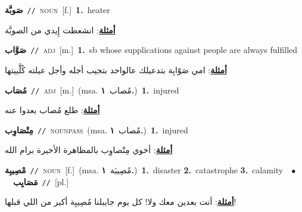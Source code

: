 \documentclass[10pt,a4paper,twoside]{article} %
\begin{document}
\begin{multicols}{2}
{\setlength\topsep{0pt}\textbf{\foreignlanguage{arabic}{صَوبَّة}}\ {\color{gray}\texttt{//}\color{black}}\ \textsc{noun}\ [f.]\ \textbf{1.}~heater\  \begin{flushright}\color{gray}\foreignlanguage{arabic}{\textbf{\underline{\foreignlanguage{arabic}{أمثلة}}}: انشعطت إِيدي من الصوبَّة}\end{flushright}\color{black}} \vspace{2mm}

{\setlength\topsep{0pt}\textbf{\foreignlanguage{arabic}{صَوَّاب}}\ {\color{gray}\texttt{//}\color{black}}\ \textsc{adj}\ [m.]\ \textbf{1.}~sb whose supplications against people are always fulfilled\  \begin{flushright}\color{gray}\foreignlanguage{arabic}{\textbf{\underline{\foreignlanguage{arabic}{أمثلة}}}: امي صَوّابِة بتدعيلك عالواحد بتجيب أجله وأجل عيلته كُلَّييتها}\end{flushright}\color{black}} \vspace{2mm}

{\setlength\topsep{0pt}\textbf{\foreignlanguage{arabic}{مُصَاب}}\ {\color{gray}\texttt{//}\color{black}}\ \textsc{adj}\ [m.]\ \color{gray}(msa. \foreignlanguage{arabic}{مُصاب}~\foreignlanguage{arabic}{\textbf{١.}})\color{black}\ \textbf{1.}~injured\  \begin{flushright}\color{gray}\foreignlanguage{arabic}{\textbf{\underline{\foreignlanguage{arabic}{أمثلة}}}: طلع مُصاب بعدوا عنه}\end{flushright}\color{black}} \vspace{2mm}

{\setlength\topsep{0pt}\textbf{\foreignlanguage{arabic}{مِتْصَاوِب}}\ {\color{gray}\texttt{//}\color{black}}\ \textsc{noun\textunderscore pass}\ \color{gray}(msa. \foreignlanguage{arabic}{مُصاب}~\foreignlanguage{arabic}{\textbf{١.}})\color{black}\ \textbf{1.}~injured\  \begin{flushright}\color{gray}\foreignlanguage{arabic}{\textbf{\underline{\foreignlanguage{arabic}{أمثلة}}}: أخوي مِتْصاوِب بالمظاهرة الأخيرة برام الله}\end{flushright}\color{black}} \vspace{2mm}

{\setlength\topsep{0pt}\textbf{\foreignlanguage{arabic}{مْصِيبِة}}\ {\color{gray}\texttt{//}\color{black}}\ \textsc{noun}\ [f.]\ \color{gray}(msa. \foreignlanguage{arabic}{مُصِيبَة}~\foreignlanguage{arabic}{\textbf{١.}})\color{black}\ \textbf{1.}~disaster  \textbf{2.}~catastrophe  \textbf{3.}~calamity\ \ $\bullet$\ \ \setlength\topsep{0pt}\textbf{\foreignlanguage{arabic}{مَصَايِب}}\ {\color{gray}\texttt{//}\color{black}}\ [pl.]\  \begin{flushright}\color{gray}\foreignlanguage{arabic}{\textbf{\underline{\foreignlanguage{arabic}{أمثلة}}}: أنت بعدين معك ولا! كل يوم جايبلنا مُصِيبِة أكبر من اللي قبلها!}\end{flushright}\color{black}} \vspace{2mm}


\end{multicols}
\end{document}

